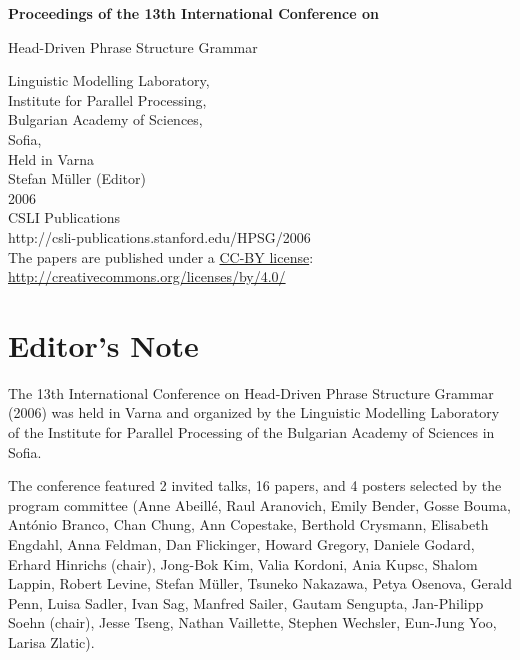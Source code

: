 \documentclass[11pt,a4paper,fleqn]{article}
\begin{document}
\begin{center}
{\Large
                {\bfseries Proceedings of the 13th International Conference on\par Head-Driven Phrase Structure Grammar\par}

                \vspace{8ex}

                     Linguistic Modelling Laboratory,\\Institute for Parallel Processing,\\Bulgarian Academy of Sciences,\\Sofia,\\Held in Varna\\[\baselineskip]

                        Stefan M{\"u}ller (Editor)\\[\baselineskip]

                                2006\\[\baselineskip]

                          CSLI Publications\\[\baselineskip]

              http://csli-publications.stanford.edu/HPSG/2006 \\[4\baselineskip]

The papers are published under a \href{http://creativecommons.org/licenses/by/4.0/}{CC-BY license}:\\[3pt]
\href{http://creativecommons.org/licenses/by/4.0/}{http://creativecommons.org/licenses/by/4.0/}
}
\end{center}
\newpage
\tableofcontents

\newpage

\section{Editor's Note}
The 13th International Conference on Head-Driven Phrase Structure Grammar (2006) was held in Varna
and organized by the Linguistic Modelling Laboratory of the Institute for Parallel Processing of the
Bulgarian Academy of Sciences in Sofia.

The conference featured 2 invited talks, 16 papers, and 4 posters
selected by the program committee 
(Anne Abeillé,
Raul Aranovich,
Emily Bender,
Gosse Bouma,
António Branco,
Chan Chung,
Ann Copestake,
Berthold Crysmann,
Elisabeth Engdahl,
Anna Feldman,
Dan Flickinger,
Howard Gregory,
Daniele Godard,
Erhard Hinrichs (chair),
Jong-Bok Kim,
Valia Kordoni,
Ania Kupsc,
Shalom Lappin,
Robert Levine,
Stefan Müller,
Tsuneko Nakazawa,
Petya Osenova,
Gerald Penn,
Luisa Sadler,
Ivan Sag,
Manfred Sailer,
Gautam Sengupta,
Jan-Philipp Soehn (chair),
Jesse Tseng,
Nathan Vaillette,
Stephen Wechsler,
Eun-Jung Yoo,
Larisa Zlatic).
\end{document}
